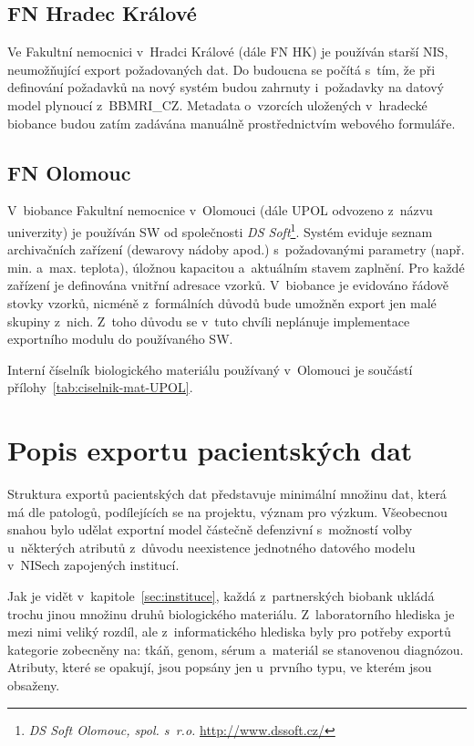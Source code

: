 \documentclass[11pt, draft, oneside]{fithesis2}
\newcommand{\ProjectName}{\mbox{BBMRI\_CZ}\xspace}
\begin{document}
\subsection{FN Hradec Králové}
Ve Fakultní nemocnici v~Hradci Králové (dále FN HK) je používán starší NIS, neumožňující export požadovaných dat. Do budoucna se počítá s~tím, že při definování požadavků na nový systém budou zahrnuty i~požadavky na datový model plynoucí z~\ProjectName. Metadata o~vzorcích uložených v~hradecké biobance budou zatím zadávána manuálně prostřednictvím webového formuláře.

\subsection{FN Olomouc}
V~biobance Fakultní nemocnice v~Olomouci (dále UPOL odvozeno z~názvu univerzity) je používán SW od společnosti \textit{DS Soft}\footnote{\textit{DS Soft Olomouc, spol. s~r.o.} \url{http://www.dssoft.cz/}}. Systém eviduje seznam archivačních zařízení (dewarovy nádoby apod.) s~požadovanými parametry (např. min. a~max. teplota), úložnou kapacitou a~aktuálním stavem zaplnění. Pro každé zařízení je definována vnitřní adresace vzorků.
V~biobance je evidováno řádově stovky vzorků, nicméně z~formálních důvodů bude umožněn export jen malé skupiny z~nich. Z~toho důvodu se v~tuto chvíli neplánuje implementace exportního modulu do používaného SW.

Interní číselník biologického materiálu používaný v~Olomouci je součástí přílohy~\ref{tab:ciselnik-mat-UPOL}.


\section{Popis exportu pacientských dat}
Struktura exportů pacientských dat představuje minimální množinu dat, která má dle patologů, podílejících se na projektu, význam pro výzkum. Všeobecnou snahou bylo udělat exportní model částečně defenzivní s~možností volby u~některých atributů z~důvodu neexistence jednotného datového modelu v~NISech zapojených institucí.

Jak je vidět v~kapitole~\ref{sec:instituce}, každá z~partnerských biobank ukládá trochu jinou množinu druhů biologického materiálu. Z~laboratorního hlediska je mezi nimi veliký rozdíl, ale z~informatického hlediska byly pro potřeby exportů kategorie zobecněny na: tkáň, genom, sérum a~materiál se stanovenou diagnózou. Atributy, které se opakují, jsou popsány jen u~prvního typu, ve kterém jsou obsaženy.
\end{document}
